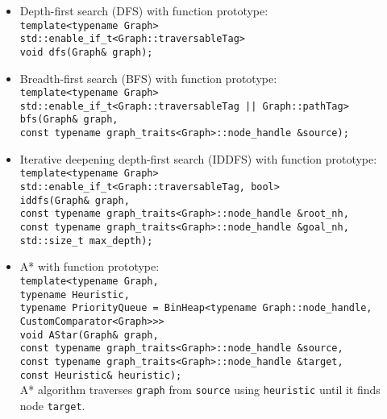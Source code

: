 \documentclass{article}
\begin{document}
\begin{itemize}
	\item Depth-first search (DFS) with function prototype:\\
		\texttt{template<typename Graph>\\
		std::enable\_if\_t<Graph::traversableTag>\\
		void dfs(Graph\& graph);}
	\item Breadth-first search (BFS) with function prototype:\\
		\texttt{template<typename Graph>\\
		std::enable\_if\_t<Graph::traversableTag || Graph::pathTag>\\
		bfs(Graph\& graph,\\\hspace*{2em}
		const typename graph\_traits<Graph>::node\_handle
				 \&source);}
	\item Iterative deepening depth-first search (IDDFS) with function prototype:\\
		\texttt{template<typename Graph>\\
		std::enable\_if\_t<Graph::traversableTag, bool>\\
		iddfs(Graph\& graph,\\\hspace*{3em}
		const typename graph\_traits<Graph>::node\_handle \&root\_nh,\\\hspace*{3em}
		const typename graph\_traits<Graph>::node\_handle \&goal\_nh,\\\hspace*{3em}
	std::size\_t max\_depth);}
	\item A* with function prototype:\\
		\texttt{template<typename Graph,\\\hspace*{4.75em}typename
			Heuristic,\\\hspace*{4.75em}
			typename PriorityQueue = BinHeap<typename Graph::node\_handle,\\\hspace*{21em}
			CustomComparator<Graph>>>\\
			void AStar(Graph\& graph,\\\hspace*{5.27em}
			const typename graph\_traits<Graph>::node\_handle \&source,\\\hspace*{5.27em}
			const typename graph\_traits<Graph>::node\_handle \&target,\\\hspace*{5.27em}
			const Heuristic\& heuristic);}\\
		A* algorithm traverses \texttt{graph} from \texttt{source} using \texttt{heuristic} until it finds node \texttt{target}.
\end{itemize}
\end{document}
